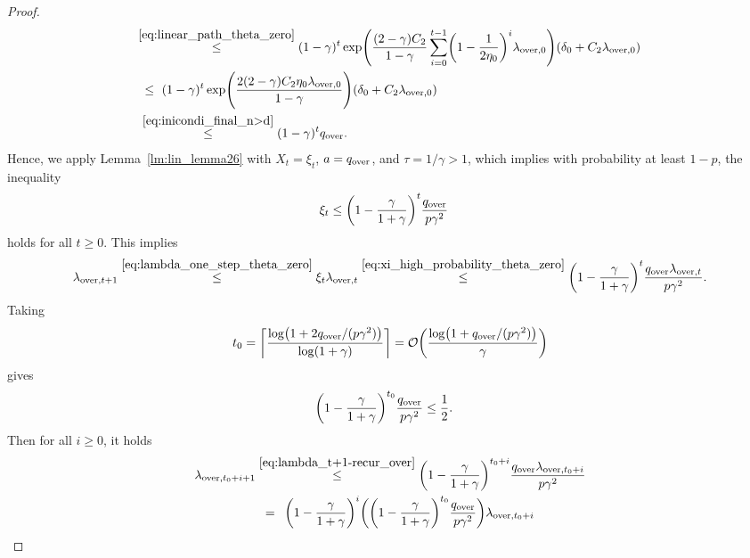\documentclass[11pt]{article}
\theoremstyle{plain}
\theoremstyle{definition}
\theoremstyle{remark}
\theoremstyle{plain}
\def\OM{{\mathcal O}}
\begin{document}
\begin{proof}
\begin{align}
\begin{split}
&\!\!\overset{ \eqref{eq:linear_path_theta_zero}}{\leq}
(1-\gamma)^t\exp\Biggl(\frac{(2-\gamma)C_2}{1-\gamma}
\sum_{i=0}^{t-1}\biggl(1-\frac{1}{2\eta_0}\biggr)^i
\lambda_{\mathrm{over},0}\Biggr)
(\delta_0+C_2\lambda_{\mathrm{over},0})\\
&\,\leq\,\,(1-\gamma)^t
\exp\Biggl(\frac{2(2-\gamma)C_2\eta_0\lambda_{\mathrm{over},0}}{1-\gamma}\Biggl)
(\delta_0+C_2\lambda_{\mathrm{over},0})\\
&\overset{\eqref{eq:inicondi_final_n>d}}{\leq}
(1-\gamma)^tq_{\text{\rm over}}.
\end{split}
\end{align}
Hence, we apply Lemma~\ref{lm:lin_lemma26} with
$X_t=\xi_t$, $a=q_{\text{\rm over}}$, and $\tau=1/\gamma>1$, which implies with probability at least $1-p$, the inequality
\begin{align}
\label{eq:xi_high_probability_theta_zero}
\xi_t
&\leq\biggl(1-\frac{\gamma}{1+\gamma}\biggr)^t
\frac{q_{\text{\rm over}}}{p\gamma^2}
\end{align}
holds for all $t\geq0$.
This implies
\begin{align}
\label{eq:lambda_t+1-recur_over}
\lambda_{\mathrm{over},t+1}\overset{\eqref{eq:lambda_one_step_theta_zero}}{\leq} \xi_t\lambda_{\mathrm{over},t}
\overset{
\eqref{eq:xi_high_probability_theta_zero}}{\leq}
\biggl(1-\frac{\gamma}{1+\gamma}\biggr)^t
\frac{q_{\text{\rm over}}\lambda_{\mathrm{over},t}}{p\gamma^2}.
\end{align}
Taking
\begin{align*}
t_0
=\biggl\lceil
\frac{\log\bigl(1+2q_{\text{\rm over}}/(p\gamma^2)\bigr)}{\log(1+\gamma)}
\biggr\rceil=\OM\biggl(\frac{\log\bigl(1+q_{\text{\rm over}}/(p\gamma^2)\bigr)}{\gamma}\biggr)
\end{align*}
gives 
\begin{align}
\label{eq:superlinearleq1/2_over}
\biggl(1-\frac{\gamma}{1+\gamma}\biggr)^{t_0}
\frac{q_{\text{\rm over}}}{p\gamma^2}
&\leq\frac{1}{2}.
\end{align}
Then for all $i\geq0$, it holds
\begin{align*}
\lambda_{\mathrm{over},t_0+i+1}
&\overset{\eqref{eq:lambda_t+1-recur_over}}{\leq}
\biggl(1-\frac{\gamma}{1+\gamma}\biggr)^{t_0+i}
\frac{q_{\text{\rm over}}\lambda_{\mathrm{over},t_0+i}}{p\gamma^2}
\\
&~\,=\,\,\,\biggl(1-\frac{\gamma}{1+\gamma}\biggr)^i
\biggl(\biggl(1-\frac{\gamma}{1+\gamma}\biggr)^{t_0}
\frac{q_{\text{\rm over}}}{p\gamma^2}\biggr)
\lambda_{\mathrm{over},t_0+i}\\

\end{align*}
\end{proof}
\end{document}
